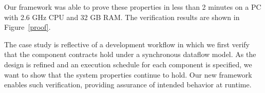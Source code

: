 Our framework was able to prove these properties in less than 2 minutes on a PC with 2.6 GHz CPU and 32 GB RAM. The verification results are shown in Figure~\ref{proof}. 

The case study is reflective of a development workflow in which we first verify that the component contracts hold under a synchronous dataflow model.  As the design is refined and an execution schedule for each component is specified, we want to show that the system properties continue to hold.  Our new framework enables such verification, providing assurance of intended behavior at runtime. 